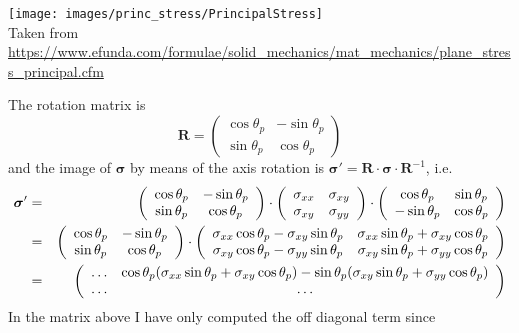 \begin{center}
\texttt{[image: images/princ\_stress/PrincipalStress]}\\
{\scriptsize Taken from \url{https://www.efunda.com/formulae/solid_mechanics/mat_mechanics/plane_stress_principal.cfm}}
\end{center}
The rotation matrix is 
\[
{\bm R}=
\left(
\begin{array}{cc}
\cos\theta_p & -\sin\theta_p \\
\sin\theta_p & \cos\theta_p
\end{array}
\right)
\]
and the image of ${\bm \sigma}$ by means of the axis rotation is 
${\bm \sigma}'= {\bm R}\cdot {\bm \sigma}\cdot {\bm R}^{-1}$, i.e.
\begin{eqnarray}
{\bm \sigma}' 
&=&
\left(
\begin{array}{cc}
\cos\theta_p & -\sin\theta_p \\
\sin\theta_p & \cos\theta_p
\end{array}
\right)
\cdot
\left(
\begin{array}{cc}
\sigma_{xx} & \sigma_{xy} \\
\sigma_{xy} & \sigma_{yy} 
\end{array}
\right)
\cdot
\left(
\begin{array}{cc}
\cos\theta_p & \sin\theta_p \\
-\sin\theta_p & \cos\theta_p
\end{array}
\right) \nonumber\\
&=&\left(
\begin{array}{cc}
\cos\theta_p & -\sin\theta_p \\
\sin\theta_p & \cos\theta_p
\end{array}
\right)
\cdot
\left(
\begin{array}{cc}
\sigma_{xx} \cos\theta_p - \sigma_{xy} \sin\theta_p  &
\sigma_{xx} \sin\theta_p + \sigma_{xy} \cos\theta_p  \\
\sigma_{xy} \cos\theta_p - \sigma_{yy} \sin\theta_p & 
\sigma_{xy} \sin\theta_p + \sigma_{yy} \cos\theta_p 
\end{array}
\right) \nonumber\\
&=&
\left(
\begin{array}{cc}
\dots & 
\cos\theta_p(\sigma_{xx} \sin\theta_p + \sigma_{xy} \cos\theta_p )-
\sin\theta_p(\sigma_{xy} \sin\theta_p + \sigma_{yy} \cos\theta_p ) \\
\dots & \dots 
\end{array}
\right) \nonumber 
\end{eqnarray}
In the matrix above I have only computed the off diagonal term since 
